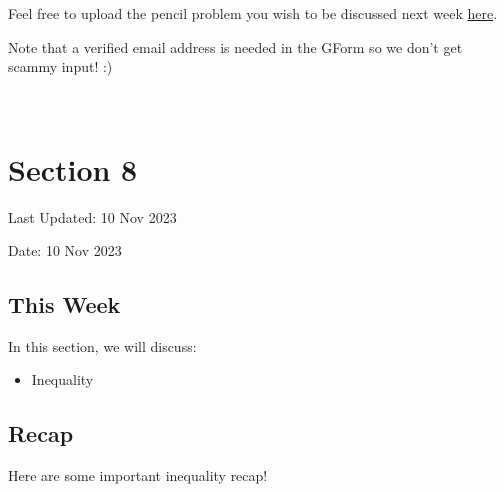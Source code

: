 \documentclass[
  letterpaper,
  DIV=11,
  numbers=noendperiod]{scrreprt}
\providecommand{\tightlist}{%
  \setlength{\itemsep}{0pt}\setlength{\parskip}{0pt}}\usepackage{longtable,booktabs,array}
\theoremstyle{plain}
\theoremstyle{definition}
\theoremstyle{remark}
\begin{document}
Feel free to upload the pencil problem you wish to be discussed next
week \href{https://forms.gle/RBmMNYJp4u3qD5W79}{here}.

Note that a verified email address is needed in the GForm so we don't
get scammy input! :)

\(\,\)


\hypertarget{section-8}{%
\chapter*{Section 8}\label{section-8}}


Last Updated: 10 Nov 2023

Date: 10 Nov 2023

\hypertarget{this-week}{%
\section*{This Week}\label{this-week}}


In this section, we will discuss:

\begin{itemize}
\tightlist
\item
  Inequality
\end{itemize}

\hypertarget{recap}{%
\section*{Recap}\label{recap}}


Here are some important inequality recap!
\end{document}

